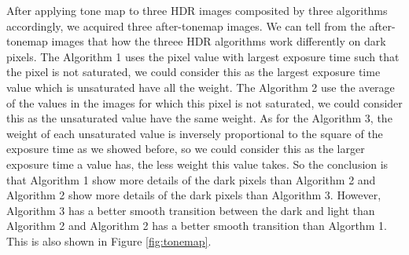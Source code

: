 \documentclass[10pt,twocolumn,letterpaper]{article}
\begin{document}
After applying tone map to three HDR images composited by three algorithms accordingly, we acquired three after-tonemap images. We can tell from the after-tonemap images that how the threee HDR algorithms work differently on dark pixels. The Algorithm 1 uses the pixel value with largest exposure time such that the pixel is not saturated, we could consider this as the largest exposure time value which is unsaturated have all the weight. The Algorithm 2 use the average of the values in the images for which this pixel is not saturated, we could consider this as the unsaturated value have the same weight. As for the Algorithm 3, the weight of each unsaturated value is inversely proportional to the square of the exposure time as we showed before, so we could consider this as the larger exposure time a value has, the less weight this value takes. So the conclusion is that Algorithm 1 show more details of the dark pixels than Algorithm 2 and Algorithm 2 show more details of the dark pixels than Algorithm 3. However, Algorithm 3 has a better smooth transition between the dark and light than Algorithm 2 and Algorithm 2 has a better smooth transition than Algorthm 1. This is also shown in Figure \ref{fig:tonemap}.
\end{document}
